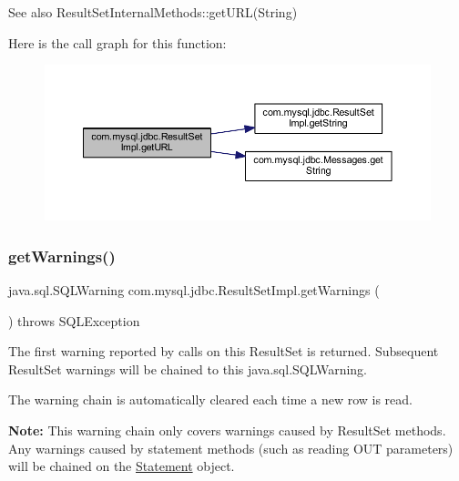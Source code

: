 \begin{DoxySeeAlso}{See also}
Result\+Set\+Internal\+Methods\+::get\+U\+R\+L(\+String) 
\end{DoxySeeAlso}
Here is the call graph for this function\+:
\nopagebreak
\begin{figure}[H]
\begin{center}
\leavevmode
\includegraphics[width=350pt]{classcom_1_1mysql_1_1jdbc_1_1_result_set_impl_acbd852b20d25a94e3c4ba7b9612c65ed_cgraph}
\end{center}
\end{figure}
\mbox{\label{classcom_1_1mysql_1_1jdbc_1_1_result_set_impl_a1f40b1109e74ab3c59104273b350d8e2}} 
\subsubsection{\texorpdfstring{get\+Warnings()}{getWarnings()}}
{\footnotesize\ttfamily java.\+sql.\+S\+Q\+L\+Warning com.\+mysql.\+jdbc.\+Result\+Set\+Impl.\+get\+Warnings (\begin{DoxyParamCaption}{ }\end{DoxyParamCaption}) throws S\+Q\+L\+Exception}

The first warning reported by calls on this Result\+Set is returned. Subsequent Result\+Set warnings will be chained to this java.\+sql.\+S\+Q\+L\+Warning.

The warning chain is automatically cleared each time a new row is read. 

{\bfseries Note\+:} This warning chain only covers warnings caused by Result\+Set methods. Any warnings caused by statement methods (such as reading O\+UT parameters) will be chained on the \mbox{\hyperlink{interfacecom_1_1mysql_1_1jdbc_1_1_statement}{Statement}} object. 

